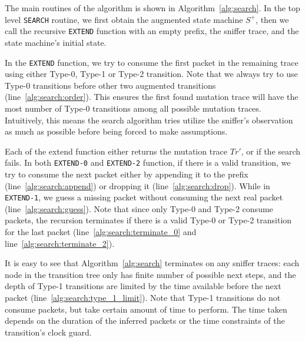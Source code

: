 \begin{algorithm}[t!]
\begin{algorithmic}[1]
          \label{alg:search:terminate_2}
        \EndIf
        \label{alg:search:drop}
        \EndIf
      \EndFor
    \EndFunction
  \end{algorithmic}
\end{algorithm}



The main routines of the algorithm is shown in Algorithm~\ref{alg:search}.
%
In the top level \texttt{SEARCH} routine, we first obtain the augmented state
machine $S^+$, then we call the recursive \texttt{EXTEND} function with an empty
prefix, the sniffer trace, and the state machine's initial state.

In the \texttt{EXTEND} function, we try to consume the first packet in the
remaining trace using either Type-0, Type-1 or Type-2 transition.
%
Note that we
always try to use Type-0 transitions before other two augmented transitions
(line~\ref{alg:search:order}).
%
This ensures the first found mutation trace will have the most number of Type-0
transitions among all possible mutation traces.
%
Intuitively, this means the search algorithm tries utilize the sniffer's
observation as much as possible before being forced to make assumptions.


Each of the extend function either returns the mutation trace $Tr'$, or
\textit{\nil} if the search fails.
%
In both \texttt{EXTEND-0} and
\texttt{EXTEND-2} function, if there is a valid transition, we try to consume
the next packet either by appending it to the prefix
(line~\ref{alg:search:append}) or dropping it (line~\ref{alg:search:drop}).
%
While in \texttt{EXTEND-1}, we guess a missing packet without consuming the next
real packet (line~\ref{alg:search:guess}).
%
Note that since only Type-0 and Type-2 consume packets, the recursion terminates
if there is a valid Type-0 or Type-2 transition for the last packet
(line~\ref{alg:search:terminate_0} and line~\ref{alg:search:terminate_2}).



It is easy to see that Algorithm~\ref{alg:search} terminates on any sniffer
traces: each node in the transition tree only has finite number of possible next
steps, and the depth of Type-1 transitions are limited by the time available
before the next packet (line~\ref{alg:search:type_1_limit}).
%
Note that Type-1
transitions do not consume packets, but take certain amount of time to perform.
%
The time taken depends on the duration of the inferred packets or the time
constraints of the transition's clock guard.
